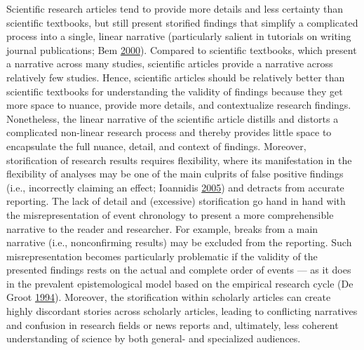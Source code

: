 \documentclass[a5paper]{book}
\begin{document}
Scientific research articles tend to provide more details and less
certainty than scientific textbooks, but still present storified
findings that simplify a complicated process into a single, linear
narrative (particularly salient in tutorials on writing journal
publications; Bem
\protect\hyperlink{ref-doi:10.1017ux2fcbo9780511807862.002}{2000}).
Compared to scientific textbooks, which present a narrative across many
studies, scientific articles provide a narrative across relatively few
studies. Hence, scientific articles should be relatively better than
scientific textbooks for understanding the validity of findings because
they get more space to nuance, provide more details, and contextualize
research findings. Nonetheless, the linear narrative of the scientific
article distills and distorts a complicated non-linear research process
and thereby provides little space to encapsulate the full nuance,
detail, and context of findings. Moreover, storification of research
results requires flexibility, where its manifestation in the flexibility
of analyses may be one of the main culprits of false positive findings
(i.e., incorrectly claiming an effect; Ioannidis
\protect\hyperlink{ref-doi:10.1371ux2fjournal.pmed.0020124}{2005}) and
detracts from accurate reporting. The lack of detail and (excessive)
storification go hand in hand with the misrepresentation of event
chronology to present a more comprehensible narrative to the reader and
researcher. For example, breaks from a main narrative (i.e.,
nonconfirming results) may be excluded from the reporting. Such
misrepresentation becomes particularly problematic if the validity of
the presented findings rests on the actual and complete order of events
--- as it does in the prevalent epistemological model based on the
empirical research cycle (De Groot
\protect\hyperlink{ref-isbn:9789023228912}{1994}). Moreover, the
storification within scholarly articles can create highly discordant
stories across scholarly articles, leading to conflicting narratives and
confusion in research fields or news reports and, ultimately, less
coherent understanding of science by both general- and specialized
audiences.
\end{document}
